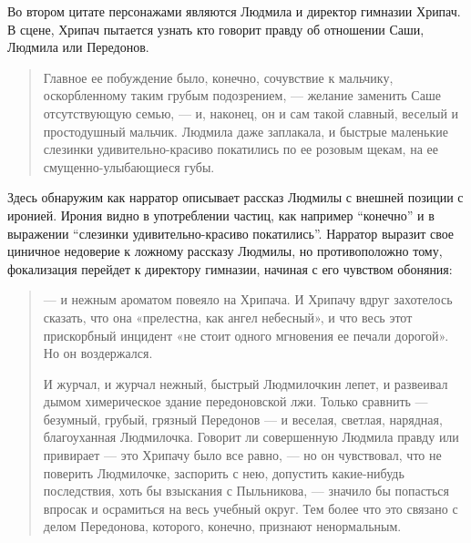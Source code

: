 \documentclass[12pt,a4paper]{article}
\begin{document}
Во втором цитате персонажами являются Людмила и директор гимназии Хрипач. В сцене, Хрипач пытается узнать кто говорит правду об отношении Саши, Людмила или Передонов. 

\begin{quote}
Главное ее побуждение было,
конечно, сочувствие к мальчику, оскорбленному таким грубым 
подозрением, — желание заменить Саше отсутствующую семью, — и, 
наконец, он и сам такой славный, веселый и простодушный мальчик. 
Людмила даже заплакала, и быстрые маленькие слезинки 
удивительно-красиво покатились по ее розовым щекам, на ее смущенно-улыбающиеся
губы. \parencite[239]{sologub2004}
\end{quote}

Здесь обнаружим как нарратор описывает рассказ Людмилы с внешней позиции с иронией. Ирония видно в употреблении частиц, как например \enquote{конечно} и в выражении \enquote{слезинки удивительно-красиво покатились}. Нарратор выразит свое циничное недоверие к ложному рассказу Людмилы, но противоположно тому, фокализация перейдет к директору гимназии, начиная с его чувством обоняния:

\begin{quote}

— и нежным ароматом повеяло на Хрипача. И Хрипачу
вдруг захотелось сказать, что она «прелестна, как ангел небесный», и
что весь этот прискорбный инцидент «не стоит одного мгновения ее 
печали дорогой». Но он воздержался.

И журчал, и журчал нежный, быстрый Людмилочкин лепет, и 
развеивал дымом химерическое здание передоновской лжи. Только 
сравнить — безумный, грубый, грязный Передонов — и веселая, светлая,
нарядная, благоуханная Людмилочка. Говорит ли совершенную 
Людмила правду или привирает — это Хрипачу было все равно, — но он 
чувствовал, что не поверить Людмилочке, заспорить с нею, допустить 
какие-нибудь последствия, хоть бы взыскания с Пыльникова, — значило
бы попасться впросак и осрамиться на весь учебный округ. Тем более
что это связано с делом Передонова, которого, конечно, признают 
ненормальным. \parencite[240]{sologub2004}
\end{quote}
\end{document}

